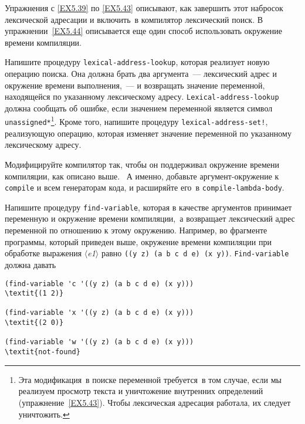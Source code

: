 Упражнения с \ref{EX5.39} по 
\ref{EX5.43} описывают, как завершить этот набросок
лексической адресации и включить~в компилятор лексический поиск.  В
упражнении~\ref{EX5.44} описывается еще один способ
использовать окружение времени компиляции.
\begin{exercise}{5.39}%
\label{EX5.39}%
Напишите процедуру {\tt lexical-address-lookup},
которая реализует новую операцию поиска.  Она должна брать два
аргумента~--- лексический адрес и окружение времени выполнения,~--- и
возвращать значение переменной, находящейся по указанному лексическому
адресу.  {\tt Lexical-address-lookup} должна сообщать об
ошибке, если значением переменной является символ
{\tt *unassigned*}\footnote{Эта модификация~в поиске переменной требуется~в том
случае, если мы реализуем   просмотр текста и уничтожение внутренних
определений (упражнение~\ref{EX5.43}).  Чтобы лексическая
адресация работала, их следует уничтожить.
}.
Кроме того, напишите процедуру {\tt lexical-address-set!},
реализующую операцию, которая изменяет значение переменной по
указанному лексическому адресу.
\end{exercise}
\begin{exercise}{5.40}%
\label{EX5.40}%
Модифицируйте компилятор так, чтобы он поддерживал
окружение времени компиляции, как описано выше. ~А именно,
добавьте аргумент-окружение к {\tt compile} и всем генераторам
кода, и расширяйте его~в {\tt compile-lambda-body}.
\end{exercise}
\begin{exercise}{5.41}%
\label{EX5.41}%
Напишите процедуру {\tt find-variable}, которая в
качестве аргументов принимает переменную и окружение времени
компиляции,~а возвращает лексический адрес переменной по отношению к
этому окружению.  Например, во фрагменте программы, который приведен
выше, окружение времени компиляции при обработке выражения
\textit{$\langle$e1$\rangle$} равно {\tt ((y z) (a b c d e) (x y))}.
{\tt Find-variable} должна давать

\begin{Verbatim}[fontsize=\small]
(find-variable 'c '((y z) (a b c d e) (x y)))
\textit{(1 2)}

(find-variable 'x '((y z) (a b c d e) (x y)))
\textit{(2 0)}

(find-variable 'w '((y z) (a b c d e) (x y)))
\textit{not-found}
\end{Verbatim}
\end{exercise}
